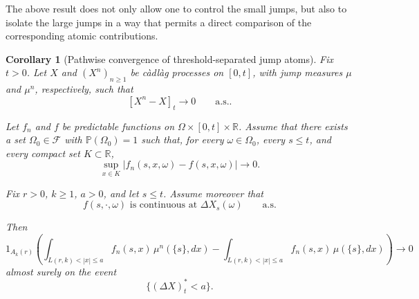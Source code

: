 \documentclass[a4paper,10pt]{article}
\newtheorem{corollary}[thm]{Corollary}
\begin{document}
The above result does not only allow one to control the small jumps, but also to isolate the large jumps in a way that permits a direct comparison of the corresponding atomic contributions.
\begin{corollary}[Pathwise convergence of threshold-separated jump atoms]
\label{cor:large-jump-atomic-integrands-same-fn}
Fix \(t>0\). Let \(X\) and \((X^n)_{n\ge1}\) be càdlàg processes
on \([0,t]\), with jump measures \(\mu\) and \(\mu^n\),
respectively, such that
\[
[X^n-X]_t \to 0
\qquad \text{a.s.}.
\]

Let \(f_n\) and \(f\) be predictable functions on \(\Omega\times[0,t]\times\mathbb R\). Assume that there exists a set
\(\Omega_0\in\mathcal F\) with \(\mathbb P(\Omega_0)=1\) such that, for every
\(\omega\in\Omega_0\), every \(s\leq t\), and every compact set
\(K\subset\mathbb R\),
\[
        \sup_{x\in K}|f_n(s,x,\omega)-f(s,x,\omega)|\to0 .
\]

Fix \(r>0\), \(k\ge1\), \(a>0\), and let \(s\le t\). Assume moreover that
\[
        f(s,\cdot,\omega)
        \text{ is continuous at }\Delta X_s(\omega)
        \qquad\text{a.s.}
\]

Then
\[
1_{A_k(r)}
\left(
\int_{L(r,k)<|x|\le a} f_{n}(s,x)\,\mu^n(\{s\},dx)
-
\int_{L(r,k)<|x|\le a} f_{n}(s,x)\,\mu(\{s\},dx)
\right)
\longrightarrow 0
\]
almost surely on the event
\[
        \{(\Delta X)^*_t<a\}.
\]
\end{corollary}
\end{document}
